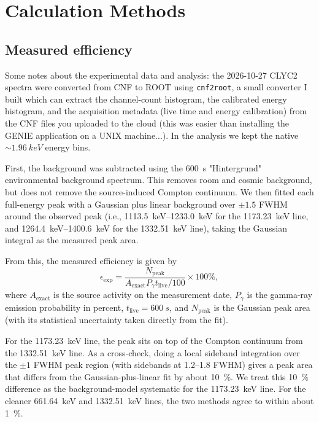 \documentclass[11pt,a4paper]{article}
\begin{document}
\section{Calculation Methods}

\subsection{Measured efficiency}
Some notes about the experimental data and analysis: the 2026-10-27 CLYC2 spectra were converted from CNF to ROOT using \texttt{cnf2root}, a small converter I built which can extract the channel-count histogram, the calibrated energy histogram, and the acquisition metadata (live time and energy calibration) from the CNF files you uploaded to the cloud (this was easier than installing the GENIE application on a UNIX machine...). 
In the analysis we kept the native $\sim\SI{1.96}{keV}$ energy bins.

First, the background was subtracted using the \SI{600}{s} "Hintergrund" environmental background spectrum. 
This removes room and cosmic background, but does not remove the source-induced Compton continuum. 
We then fitted each full-energy peak with a Gaussian plus linear background over $\pm1.5$ FWHM around the observed peak (i.e., \SI{1113.5}{keV}--\SI{1233.0}{keV} for the \SI{1173.23}{keV} line, and \SI{1264.4}{keV}--\SI{1400.6}{keV} for the \SI{1332.51}{keV} line), taking the Gaussian integral as the measured peak area.

From this, the measured efficiency is given by
\begin{equation}
  \epsilon_{\mathrm{exp}}=\frac{N_{\mathrm{peak}}}{A_{\mathrm{exact}}P_\gamma t_{\mathrm{live}}/100}\times100\%,
  \label{eq:eff-exp}
\end{equation}
where $A_{\mathrm{exact}}$ is the source activity on the measurement date, $P_\gamma$ is the gamma-ray emission probability in percent, $t_{\mathrm{live}}=\SI{600}{s}$, and $N_{\mathrm{peak}}$ is the Gaussian peak area (with its statistical uncertainty taken directly from the fit).

For the \SI{1173.23}{keV} line, the peak sits on top of the Compton continuum from the \SI{1332.51}{keV} line. As a cross-check, doing a local sideband integration over the $\pm1$ FWHM peak region (with sidebands at 1.2--1.8 FWHM) gives a peak area that differs from the Gaussian-plus-linear fit by about \SI{10}{\percent}. We treat this \SI{10}{\percent} difference as the background-model systematic for the \SI{1173.23}{keV} line. For the cleaner \SI{661.64}{keV} and \SI{1332.51}{keV} lines, the two methods agree to within about \SI{1}{\percent}.
\end{document}
